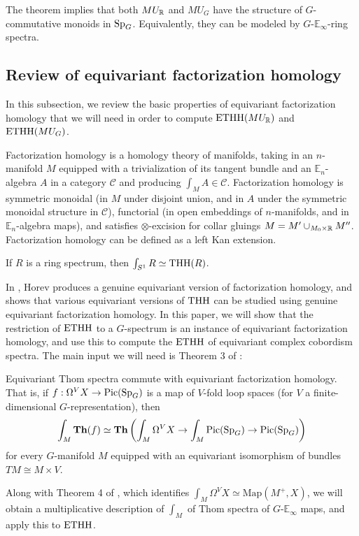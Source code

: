 The theorem implies that both $MU_{\mathbb{R}}$ and $MU_G$ have the structure of $G$-commutative monoids in $\mathrm{Sp}_G$. Equivalently, they can be modeled by $G$-$\mathbb{E}_{\infty}$-ring spectra.

\subsection{Review of equivariant factorization homology}
In this subsection, we review the basic properties of equivariant factorization homology that we will need in order to compute $\mathrm{ETHH}(MU_{\mathbb{R}})$ and $\mathrm{ETHH}(MU_G)$. 

\medskip

Factorization homology is a homology theory of manifolds, taking in an $n$-manifold $M$ equipped with a trivialization of its tangent bundle and an $\mathbb{E}_n$-algebra $A$ in a category $\mathcal{C}$ and producing $\int_M A \in \mathcal{C}$. Factorization homology is symmetric monoidal (in $M$ under disjoint union, and in $A$ under the symmetric monoidal structure in $\mathcal{C}$), functorial (in open embeddings of $n$-manifolds, and in $\mathbb{E}_n$-algebra maps), and satisfies $\otimes$-excision for collar gluings $M = M' \cup_{M_0 \times \mathbb{R}} M''$. Factorization homology can be defined as a left Kan extension.

\begin{example}
    If $R$ is a ring spectrum, then $\int_{S^1} R \simeq \mathrm{THH} (R)$.
\end{example}


In \cite{Hor}, Horev produces a genuine equivariant version of factorization homology, and shows that various equivariant versions of $\mathrm{THH}$ can be studied using genuine equivariant factorization homology. In this paper, we will show that the restriction of $\mathrm{ETHH}$ to a $G$-spectrum is an instance of equivariant factorization homology, and use this to compute the $\mathrm{ETHH}$ of equivariant complex cobordism spectra. The main input we will need is Theorem 3 of \cite{HHKWZ24}:

\begin{theorem}\label{thm-FH-Thom-HKZ}\cite{HHKWZ24}
    Equivariant Thom spectra commute with equivariant factorization homology. That is, if $f: \Omega ^V X \to \Pic(\Spg)$ is a map of $V$-fold loop spaces (for $V$ a finite-dimensional $G$-representation), then 
    $$\int_M \mathbf{Th}(f) \simeq \mathbf{Th}\left( \int_M \Omega^V X \to \int_M \Pic(\Spg) \to \Pic(\Spg)\right)$$
    for every $G$-manifold $M$ equipped with an equivariant isomorphism of bundles $TM \cong M \times V$.
\end{theorem}

Along with Theorem 4 of \cite{HHKWZ24}, which identifies $\int_M \Omega^V X \simeq \mathrm{Map}(M^+, X)$, we will obtain a multiplicative description of $\int_M$ of Thom spectra of $G$-$\mathbb{E}_\infty$ maps, and apply this to $\mathrm{ETHH}$.

